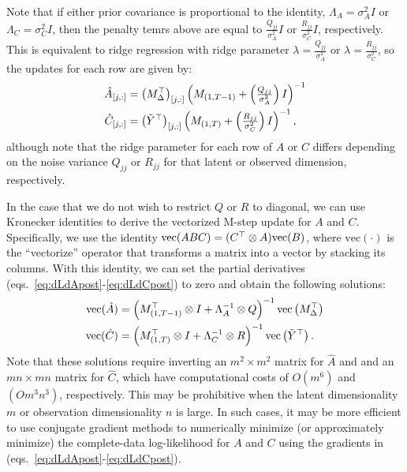 \documentclass[10pt]{article}
\newcommand{\mvec}{\mathrm{vec}}
\begin{document}
\begin{appendices}
Note that if either prior covariance is proportional to the identity,
$\Lambda_A = \sigma_A^2 I$ or $\Lambda_C = \sigma_C^2 I$, then the
penalty temrs above are equal to $\frac{Q_{jj}}{\sigma_A^2} I $ or
$\frac{R_{jj}}{\sigma_C^2} I $, respectively.  This is equivalent to
ridge regression with ridge parameter
$\lambda = \frac{Q_{jj}}{\sigma_A^2}$ or
$\lambda = \frac{R_{jj}}{\sigma_C^2}$, so the updates for each row
are given by:
\begin{align}
  \label{eq:Aridgeupdate}
\hat A_{[j,:]} &= \left(M_\Delta^\top\right) _{[j,:]} \left(
                 M_{(1,T-1)}+ \left(\tfrac{Q_{jj}}{\sigma_A^2}\right)  I\right)^{-1} 
  \\
  \label{eq:Cridgeupdate}
  \hat C_{[j,:]} &= {\left(\tilde Y^\top\right)_{[j,:]}}  \left(
           M_{(1,T)} + \left(\tfrac{R_{jj}}{\sigma_C^2}\right) I\right)^{-1},
\end{align}
although note that the ridge
parameter for each row of $A$ or $C$ differs depending on the noise
variance $Q_{jj}$ or $R_{jj}$ for that latent or observed dimension,
respectively.

In the case that we do not wish to restrict $Q$ or $R$ to diagonal, we
can use Kronecker identities to derive the vectorized M-step update
for $A$ and $C$.  Specifically, we use the identity
$\mvec(ABC) = (C\trp \otimes A) \mvec(B)$, where $\mvec(\cdot)$ is the
``vectorize'' operator that transforms a matrix into a vector by
stacking its columns. With this identity, we can set the partial
derivatives (eqs.~\ref{eq:dLdApost}-\ref{eq:dLdCpost}) to zero and
obtain the following solutions:
\begin{align}
  \label{eq:Avecpostupdate}
  \mvec(\hat A) &=
                           \left(   M_{(1,T-1)} \trp \otimes
                  I + \Lambda_A\inv \otimes  Q
                  \right)\inv 
%
                  \mvec \left(M_\Delta\trp
                \right)
  \\
  \label{eq:Cvecpostupdate}
  \mvec(  \hat C) &=   \left( M_{(1,T)}\trp \otimes I + \Lambda_C\inv
                    \otimes R \right)\inv
                  \mvec\left(\tilde
                  Y \trp
                  \right).
\end{align}
Note that these solutions require inverting an $m^2 \times m^2$ matrix
for $\hat A$ and and an $mn \times mn$ matrix for $\hat C$, which have
computational costs of $O(m^6)$ and $(Om^3n^3)$, respectively. This
may be prohibitive when the latent dimensionality $m$ or observation
dimensionality $n$ is large.  In such cases, it may be more efficient
to use conjugate gradient methods to numerically minimize (or
approximately minimize) the complete-data log-likelihood for $A$ and
$C$ using the gradients in (eqs.~\ref{eq:dLdApost}-\ref{eq:dLdCpost}).


\end{appendices}
\end{document}
